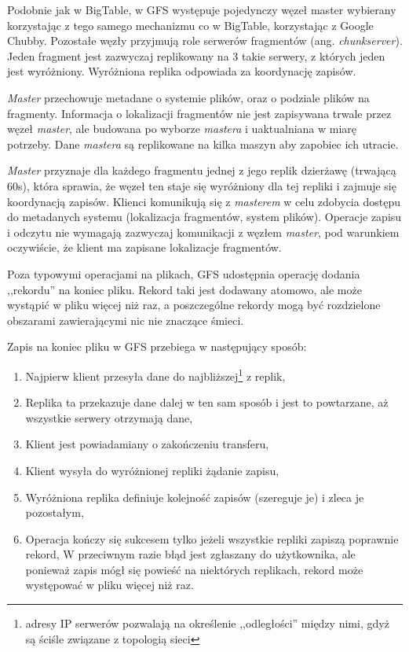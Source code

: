 Podobnie jak w BigTable, w GFS występuje pojedynczy węzeł master wybierany korzystając z tego samego mechanizmu co w BigTable, korzystając z Google Chubby.
Pozostałe węzły przyjmują role serwerów fragmentów (ang. \emph{chunkserver}).
Jeden fragment jest zazwyczaj replikowany na 3 takie serwery, z których jeden jest wyróżniony.
Wyróżniona replika odpowiada za koordynację zapisów.

\emph{Master} przechowuje metadane o systemie plików, oraz o podziale plików na fragmenty.
Informacja o lokalizacji fragmentów nie jest zapisywana trwale przez węzeł \emph{master}, ale budowana po wyborze \emph{mastera} i uaktualniana w miarę potrzeby.
Dane \emph{mastera} są replikowane na kilka maszyn aby zapobiec ich utracie.

\emph{Master} przyznaje dla każdego fragmentu jednej z jego replik dzierżawę (trwającą 60s), która sprawia, że węzeł ten staje się wyróżniony dla tej repliki i zajmuje się koordynacją zapisów.
Klienci komunikują się z \emph{masterem} w celu zdobycia dostępu do metadanych systemu (lokalizacja fragmentów, system plików).
Operacje zapisu i odczytu nie wymagają zazwyczaj komunikacji z węzłem \emph{master}, pod warunkiem oczywiście, że klient ma zapisane lokalizacje fragmentów.

Poza typowymi operacjami na plikach, GFS udostępnia operację dodania ,,rekordu'' na koniec pliku.
Rekord taki jest dodawany atomowo, ale może wystąpić w pliku więcej niż raz, a poszczególne rekordy mogą być rozdzielone obszarami zawierającymi nic nie znaczące śmieci.

Zapis na koniec pliku w GFS przebiega w następujący sposób: 
\begin{enumerate}
 \item Najpierw klient przesyła dane do najbliższej\footnote{adresy IP serwerów pozwalają na określenie ,,odległości'' między nimi, gdyż są ściśle związane z topologią sieci} z replik,
 \item Replika ta przekazuje dane dalej w ten sam sposób i jest to powtarzane, aż wszystkie serwery otrzymają dane,
 \item Klient jest powiadamiany o zakończeniu transferu,
 \item Klient wysyła do wyróżnionej repliki żądanie zapisu,
 \item Wyróżniona replika definiuje kolejność zapisów (szereguje je) i zleca je pozostałym,
 \item Operacja kończy się sukcesem tylko jeżeli wszystkie repliki zapiszą poprawnie rekord,
 W przeciwnym razie błąd jest zgłaszany do użytkownika, ale ponieważ zapis mógł się powieść na niektórych replikach, rekord może występować w pliku więcej niż raz.
\end{enumerate}

